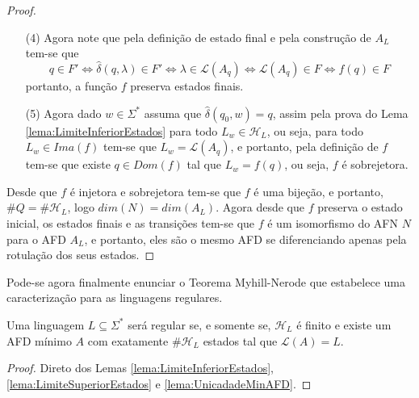 \begin{proof}
\begin{itemize}
\begin{eqnarray*}
			& \Longleftrightarrow &  au \in \mathcal{L}(A_q)\\
			& \Longleftrightarrow &  au \in f(q)\\
			& \Longleftrightarrow &  au \in L_w\\
			& \Longleftrightarrow &  wau \in L\\
			& \Longleftrightarrow &  u \in L_{wa}
		\end{eqnarray*} 
		portanto, $f(p) = L_{wa}$, ou seja, $f$ preserva transições\footnote{Isto é o mesmo que dizer que $f(\delta'(q, a)) = \delta(f(q), a)$.}.
		\item[(4)] Agora note que pela definição de estado final e pela construção de $A_L$ tem-se que 
		$$q \in F' \Longleftrightarrow \widehat{\delta}(q, \lambda) \in F' \Longleftrightarrow  \lambda \in \mathcal{L}(A_q) \Longleftrightarrow \mathcal{L}(A_q) \in F \Longleftrightarrow f(q) \in F$$
		portanto, a função $f$ preserva estados finais.
		\item[(5)] Agora dado $w \in \Sigma^*$ assuma que $\widehat{\delta}(q_0, w) = q$, assim pela prova do Lema \ref{lema:LimiteInferiorEstados} para todo $L_w \in \mathcal{H}_L$, ou seja, para todo $L_w \in Ima(f)$ tem-se que $L_w = \mathcal{L}(A_q)$, e portanto, pela definição de $f$ tem-se que existe $q \in D	om(f)$ tal que $L_w = f(q)$, ou seja, $f$ é sobrejetora.
	\end{itemize}
	Desde que $f$ é injetora e sobrejetora tem-se que $f$ é uma bijeção, e portanto, $\#Q = \#\mathcal{H}_L$, logo $dim(N) = dim(A_L)$. Agora desde que $f$ preserva o estado inicial, os estados finais e as transições tem-se que $f$ é um isomorfismo do AFN $N$ para o AFD $A_L$, e portanto, eles são o mesmo AFD se diferenciando apenas pela rotulação dos seus estados. 
\end{proof}

Pode-se agora finalmente enunciar o Teorema Myhill-Nerode que estabelece uma caracterização para as linguagens regulares.

\begin{theorem}\label{teo:Myhill-Nerode}
	Uma linguagem $L \subseteq \Sigma^*$ será regular se, e somente se, $\mathcal{H}_L$ é finito e existe um AFD mínimo $A$ com exatamente $\# \mathcal{H}_L$ estados tal que $\mathcal{L}(A) = L$.
\end{theorem}

\begin{proof}
	Direto dos Lemas \ref{lema:LimiteInferiorEstados}, \ref{lema:LimiteSuperiorEstados} e \ref{lema:UnicadadeMinAFD}.
\end{proof}

